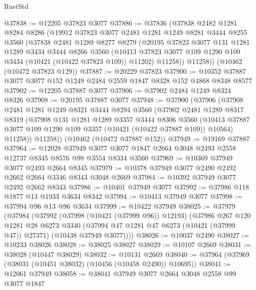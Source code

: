 \begin{lexlean}{RustStd}
\begin{coremodule}
@37838 := @12205 @37823 @3077
@37886 := @37836
    (@37838
      @2482
      @1281
      @8284
      @8286
      (@19912
        @37823
        @3077
        @2481
        @1281
        @1249
        @8281
        @3444
        @8255
        @3560
        (@37838
          @2481
          @1289
          @8277
          @8279
          (@20195
            @37823
            @3077
            @131
            @1281
            @1289
            @3434
            @3444
            @8266
            @3560
            (@10413 @37823 @3077 @109 @1290 @109 @3434 (@10421 (@10422 @37823 @109)) @11202)
            @11258))
        @11258))
    (@10462 (@10472 @37823 @129))
@37887 := @20229 @37823
@37900 := @10352 @37887 @3077 @3077 @152 @1249 @2484 @2559 @1847 @8328 @152 @4868 @8348 @8577
@37902 := @12205 @37887 @3077
@37906 := @37902 @2484 @1249 @8324 @8326
@37908 := @20195 @37887 @3077
@37948 := @37900
    (@37906
      (@37908
        @2481
        @1281
        @1249
        @8321
        @3444
        @8294
        @3560
        (@37902
          @2481
          @1289
          @8317
          @8319
          (@37908
            @131
            @1281
            @1289
            @3357
            @3444
            @8306
            @3560
            (@10413 @37887 @3077 @109 @1290 @109 @3357 (@10421 (@10422 @37887 @109)) @10564)
            @11258))
        @11258))
    (@10462 (@10472 @37887 @152))
@37949 := @19169 @37887
@37964 := @12028
    @37949
    @3077
    @3077
    @1847
    @2664
    @3048
    @2493
    @2558
    @12737
    @8345
    @8576
    @98
    @3554
    @8334
    @3560
@37969 := @10369 @37949 @3077 @2493 @2664 @8345
@37979 := @10378 @37949 @3077 @2490 @2492 @2662 @2664 @3346 @8343 @3048 @2669
@37984 := @10392 @37949 @3077 @2492 @2662 @8343
@37986 := @10401 @37949 @3077
@37992 := @37986 @118 @1877 @13 @1933 @3634 @8342
@37994 := @10413 @37949 @3077
@37998 := @37994 @96 @13 @96 @3634
@37999 := @10422 @37949
@38025 := @37979
    (@37984
      (@37992
        (@37998 (@10421 (@37999 @96)) @12193)
        (@37986
          @267
          @120
          @1281
          @28
          @6273
          @3340
          (@37994 @47 @1281 @47 @6273 (@10421 (@37999 @47)) @27371)
          (@10438 @37949 @3077))))
@38026 := @10037 @2490
@38027 := @10233 @38026
@38028 := @38025 @38027
@38029 := @10107 @2669
@38031 := @38028 (@10447 @38029)
@38032 := @10131 @2669
@38040 := @37964 (@37969 (@38031 (@10451 @38032) (@10456 (@10458 @2490)) @10695))
@38041 := @12061 @37949
@38058 := @38041
    @37949
    @3077
    @2664
    @3048
    @2558
    @99
    @3077
    @1847

\end{coremodule}
\end{lexlean}
